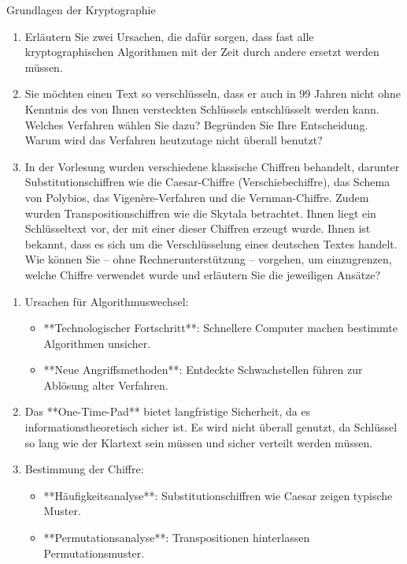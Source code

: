 \documentclass{article}
\begin{document}
\begin{exercise}{Grundlagen der Kryptographie}
  \begin{enumerate}
      \item Erläutern Sie zwei Ursachen, die dafür sorgen, dass fast alle kryptographischen Algorithmen mit der Zeit durch andere ersetzt werden müssen.
      \item Sie möchten einen Text so verschlüsseln, dass er auch in 99 Jahren nicht ohne Kenntnis des von Ihnen versteckten Schlüssels entschlüsselt werden kann. Welches Verfahren wählen Sie dazu? Begründen Sie Ihre Entscheidung. Warum wird das Verfahren heutzutage nicht überall benutzt?
      \item In der Vorlesung wurden verschiedene klassische Chiffren behandelt, darunter Substitutionschiffren wie die Caesar-Chiffre (Verschiebechiffre), das Schema von Polybios, das Vigenère-Verfahren und die Vernman-Chiffre. Zudem wurden Transpositionschiffren wie die Skytala betrachtet. Ihnen liegt ein Schlüsseltext vor, der mit einer dieser Chiffren erzeugt wurde. Ihnen ist bekannt, dass es sich um die Verschlüsselung eines deutschen Textes handelt. Wie können Sie – ohne Rechnerunterstützung – vorgehen, um einzugrenzen, welche Chiffre verwendet wurde und erläutern Sie die jeweiligen Ansätze?
  \end{enumerate}

  \begin{solution}
    \begin{enumerate}
        \item Ursachen für Algorithmuswechsel:
        \begin{itemize}
            \item **Technologischer Fortschritt**: Schnellere Computer machen bestimmte Algorithmen unsicher.
            \item **Neue Angriffsmethoden**: Entdeckte Schwachstellen führen zur Ablösung alter Verfahren.
        \end{itemize}
  
        \item Das **One-Time-Pad** bietet langfristige Sicherheit, da es informationstheoretisch sicher ist. Es wird nicht überall genutzt, da Schlüssel so lang wie der Klartext sein müssen und sicher verteilt werden müssen.
  
        \item Bestimmung der Chiffre:
        \begin{itemize}
            \item **Häufigkeitsanalyse**: Substitutionschiffren wie Caesar zeigen typische Muster.
            \item **Permutationsanalyse**: Transpositionen hinterlassen Permutationsmuster.
        \end{itemize}
    \end{enumerate}
  \end{solution}
\end{exercise}
\end{document}
